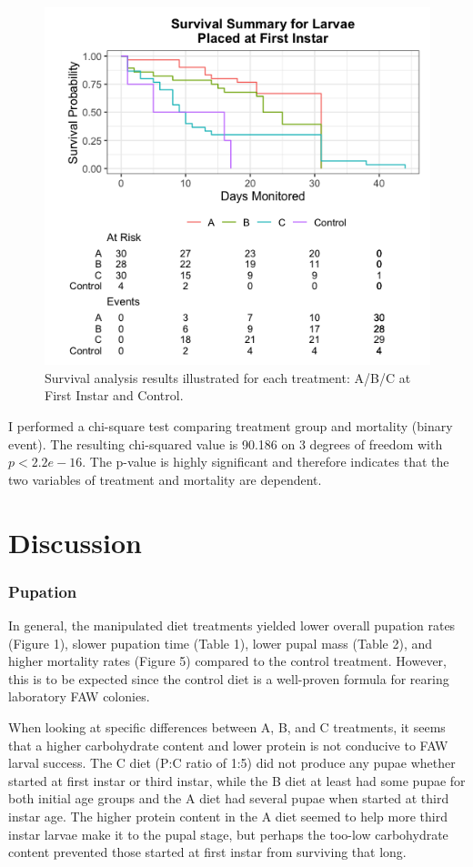\documentclass[12pt,]{article}
\begin{document}
\begin{figure}

{\centering \includegraphics[width=0.5\linewidth]{../Figures/Figure_5} 

}

\caption{Survival analysis results illustrated for each treatment: A/B/C at First Instar and Control.}\label{fig:Figure5}
\end{figure}

I performed a chi-square test comparing treatment group and mortality
(binary event). The resulting chi-squared value is 90.186 on 3 degrees
of freedom with \(p < 2.2e-16\). The p-value is highly significant and
therefore indicates that the two variables of treatment and mortality
are dependent.

\hypertarget{discussion}{%
\section{Discussion}\label{discussion}}

\hypertarget{pupation-2}{%
\subsubsection{Pupation}\label{pupation-2}}

In general, the manipulated diet treatments yielded lower overall
pupation rates (Figure 1), slower pupation time (Table 1), lower pupal
mass (Table 2), and higher mortality rates (Figure 5) compared to the
control treatment. However, this is to be expected since the control
diet is a well-proven formula for rearing laboratory FAW colonies.

When looking at specific differences between A, B, and C treatments, it
seems that a higher carbohydrate content and lower protein is not
conducive to FAW larval success. The C diet (P:C ratio of 1:5) did not
produce any pupae whether started at first instar or third instar, while
the B diet at least had some pupae for both initial age groups and the A
diet had several pupae when started at third instar age. The higher
protein content in the A diet seemed to help more third instar larvae
make it to the pupal stage, but perhaps the too-low carbohydrate content
prevented those started at first instar from surviving that long.
\end{document}
